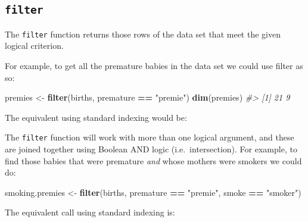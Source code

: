 \documentclass[]{book}
\newenvironment{Shaded}{\begin{snugshade}}{\end{snugshade}}
\newcommand{\CommentTok}[1]{\textcolor[rgb]{0.56,0.35,0.01}{\textit{#1}}}
\newcommand{\KeywordTok}[1]{\textcolor[rgb]{0.13,0.29,0.53}{\textbf{#1}}}
\newcommand{\NormalTok}[1]{#1}
\newcommand{\OperatorTok}[1]{\textcolor[rgb]{0.81,0.36,0.00}{\textbf{#1}}}
\newcommand{\StringTok}[1]{\textcolor[rgb]{0.31,0.60,0.02}{#1}}
\theoremstyle{definition}
\theoremstyle{definition}
\theoremstyle{definition}
\theoremstyle{remark}
\begin{document}
\hypertarget{filter}{%
\subsection{\texorpdfstring{\texttt{filter}}{filter}}\label{filter}}

The \texttt{filter} function returns those rows of the data set that
meet the given logical criterion.

For example, to get all the premature babies in the data set we could
use filter as so:

\begin{Shaded}
\begin{Highlighting}[]
\NormalTok{premies <-}\StringTok{ }\KeywordTok{filter}\NormalTok{(births, premature }\OperatorTok{==}\StringTok{ "premie"}\NormalTok{)}
\KeywordTok{dim}\NormalTok{(premies)}
\CommentTok{#> [1] 21  9}
\end{Highlighting}
\end{Shaded}

The equivalent using standard indexing would be:

\begin{Shaded}
\end{Shaded}

The \texttt{filter} function will work with more than one logical
argument, and these are joined together using Boolean AND logic
(i.e.~intersection). For example, to find those babies that were
premature \emph{and} whose mothers were smokers we could do:

\begin{Shaded}
\begin{Highlighting}[]
\NormalTok{smoking.premies <-}\StringTok{ }\KeywordTok{filter}\NormalTok{(births, premature }\OperatorTok{==}\StringTok{ "premie"}\NormalTok{, smoke }\OperatorTok{==}\StringTok{ "smoker"}\NormalTok{)}
\end{Highlighting}
\end{Shaded}

The equivalent call using standard indexing is:

\begin{Shaded}
\end{Shaded}
\end{document}
